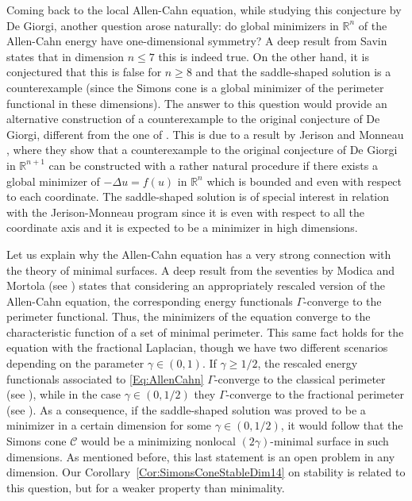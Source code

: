 \documentclass[12pt,reqno]{amsart}
\theoremstyle{definition}
\theoremstyle{remark}
\newcommand{\con}[1]{\mathbb{#1}}
\newcommand{\R}{\con{R}} %
\newcommand{\ccal}{\mathscr{C}}
\newcommand{\s}{\gamma}
\numberwithin{equation}{section}
\begin{document}
Coming back to the local Allen-Cahn equation, while studying this conjecture by De Giorgi, another question arose naturally: do global minimizers in $\R^n$ of the Allen-Cahn energy have one-dimensional symmetry? A deep result from Savin \cite{Savin-DeGiorgi} states that in dimension $n \leq 7$ this is indeed true. On the other hand, it is conjectured that this is false for $n\geq 8$ and that the saddle-shaped solution is a counterexample (since the Simons cone is a global minimizer of the perimeter functional in these dimensions). The answer to this question would provide an alternative construction of a counterexample to the original conjecture of De Giorgi, different from the one of \cite{delPinoKowalczykWei}. This is due to a result by Jerison and Monneau \cite{JerisonMonneau}, where they show that a counterexample to the original conjecture of De Giorgi in $\R^{n+1}$ can be constructed with a rather natural procedure if there exists a global minimizer of $-\Delta u = f(u)$ in $\R^n$ which is bounded and even with respect to each coordinate. The saddle-shaped solution is of special interest in relation with the Jerison-Monneau program since it is even with respect to all the coordinate axis and it is expected to be a minimizer in high dimensions.

Let us explain why the Allen-Cahn equation has a very strong connection with the theory of minimal surfaces. A deep result from the seventies by Modica and Mortola (see \cite{Modica,ModicaMortola}) states that considering an appropriately rescaled version of the Allen-Cahn equation, the corresponding energy functionals $\Gamma$-converge to the perimeter functional. Thus, the minimizers of the equation converge to the characteristic function of a set of minimal perimeter. This same fact holds for the equation with the fractional Laplacian, though we have two different scenarios depending on the parameter $\s \in (0,1)$. If $\s \geq 1/2$, the rescaled energy functionals associated to \eqref{Eq:AllenCahn} $\Gamma$-converge to the classical perimeter (see \cite{GiovanniBouchitteSeppecher,Gonzalez}), while in the case $\s \in (0,1/2)$ they $\Gamma$-converge to the fractional perimeter (see \cite{SavinValdinoci-GammaConvergence}). As a consequence, if the saddle-shaped solution was proved to be a minimizer in a certain dimension for some $\s \in (0,1/2)$, it would follow that the Simons cone $\ccal$ would be a minimizing nonlocal $(2\s)$-minimal surface in such dimensions. As mentioned before, this last statement is an open problem in any dimension. Our Corollary~\ref{Cor:SimonsConeStableDim14} on stability is related to this question, but for a weaker property than minimality.
\end{document}

